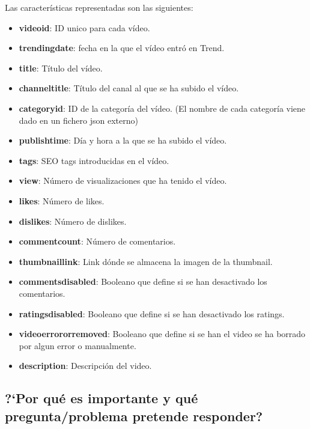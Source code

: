 \documentclass[a4paper,12pt]{article}
\begin{document}
Las caracter\'isticas representadas son las siguientes:

\begin{itemize}

\item \textbf{video{\textunderscore}id}: ID unico para cada v\'ideo.
\item \textbf{trending{\textunderscore}date}: fecha en la que el v\'ideo entr\'o en Trend.
\item \textbf{title}: T\'itulo del v\'ideo.
\item \textbf{channel{\textunderscore}title}: T\'itulo del canal al que se ha subido el v\'ideo.
\item \textbf{category{\textunderscore}id}: ID de la categor\'ia del v\'ideo. (El nombre de cada categor\'ia viene dado en un fichero json externo)
\item \textbf{publish{\textunderscore}time}: D\'ia y hora a la que se ha subido el v\'ideo.
\item \textbf{tags}: SEO tags introducidas en el v\'ideo.
\item \textbf{view}: N\'umero de visualizaciones que ha tenido el v\'ideo.
\item \textbf{likes}: N\'umero de likes.
\item \textbf{dislikes}: N\'umero de dislikes.
\item \textbf{comment{\textunderscore}count}: N\'umero de comentarios.
\item \textbf{thumbnail{\textunderscore}link}: Link d\'onde se almacena la imagen de la thumbnail.
\item \textbf{comments{\textunderscore}disabled}: Booleano que define si se han desactivado los comentarios.
\item \textbf{ratings{\textunderscore}disabled}: Booleano que define si se han desactivado los ratings.
\item \textbf{video{\textunderscore}error{\textunderscore}or{\textunderscore}removed}: Booleano que define si se han el video se ha borrado por algun error o manualmente.
\item \textbf{description}: Descripci\'on del video.

\end{itemize}

\subsection[item_importancia]{?`Por qu\'e es importante y qu\'e  pregunta/problema pretende responder?}
\end{document}
